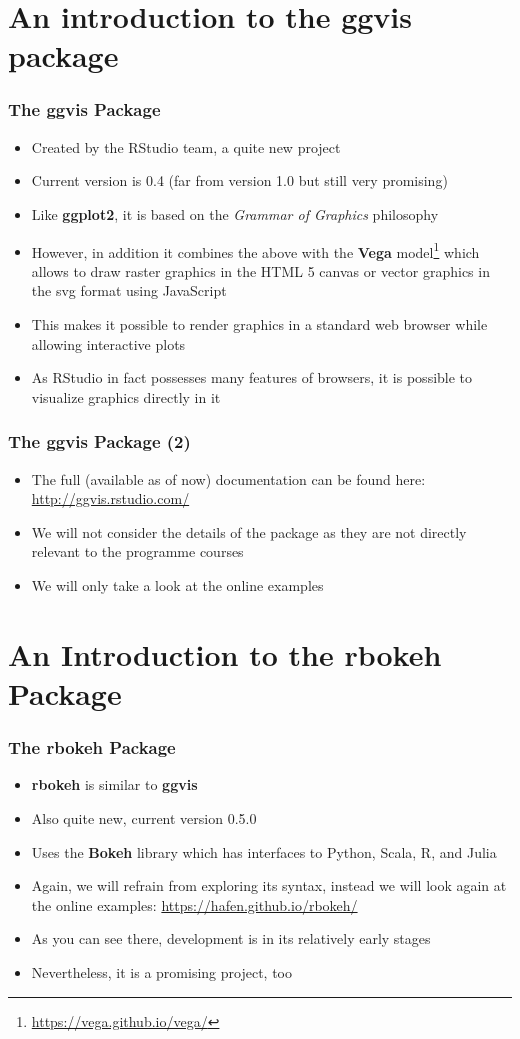 \documentclass[10pt]{beamer}
\theoremstyle{definition}
\begin{document}
\section{An introduction to the ggvis package}
\begin{frame}[fragile]
\frametitle{The \textbf{ggvis} Package}
\begin{itemize}
	\item Created by the RStudio team, a quite new project
	\item Current version is 0.4 (far from version 1.0 but still very promising)
	\item Like \textbf{ggplot2}, it is based on the \emph{Grammar of Graphics} philosophy
	\item However, in addition it combines the above with the \textbf{Vega} model\footnote{\url{https://vega.github.io/vega/}} which allows to draw raster graphics in the HTML 5 canvas or vector graphics in the svg format using JavaScript
	\item This makes it possible to render graphics in a standard web browser while allowing interactive plots
	\item As RStudio in fact possesses many features of browsers, it is possible to visualize graphics directly in it
\end{itemize}
\end{frame}

\begin{frame}[fragile]
\frametitle{The \textbf{ggvis} Package (2)}
\begin{itemize}
	\item The full (available as of now) documentation can be found here: \url{http://ggvis.rstudio.com/}
	\item We will not consider the details of the package as they are not directly relevant to the programme courses
	\item We will only take a look at the online examples
\end{itemize}
\end{frame}

\section{An Introduction to the rbokeh Package}
\begin{frame}[fragile]
\frametitle{The \textbf{rbokeh} Package}
\begin{itemize}
	\item \textbf{rbokeh} is similar to \textbf{ggvis}
	\item Also quite new, current version 0.5.0
	\item Uses the \textbf{Bokeh} library which has interfaces to Python, Scala, R, and Julia
	\item Again, we will refrain from exploring its syntax, instead we will look again at the online examples: \url{https://hafen.github.io/rbokeh/}
	\item As you can see there, development is in its relatively early stages 
	\item Nevertheless, it is a promising project, too
\end{itemize}
\end{frame}
\end{document}
